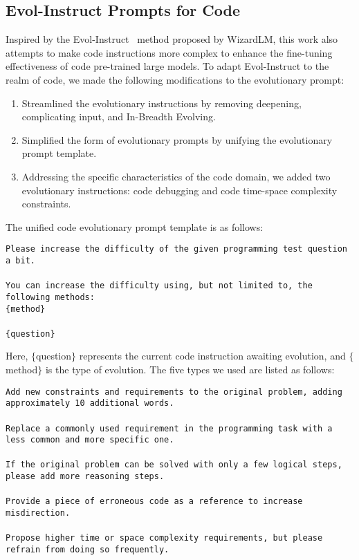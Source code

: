 \subsection{Evol-Instruct Prompts for Code}
Inspired by the Evol-Instruct~\cite{xu2023wizardlm} method proposed by WizardLM, this work also attempts to make code instructions more complex to enhance the fine-tuning effectiveness of code pre-trained large models. To adapt Evol-Instruct to the realm of code, we made the following modifications to the evolutionary prompt:
\begin{enumerate}
\item Streamlined the evolutionary instructions by removing deepening, complicating input, and In-Breadth Evolving.
\item Simplified the form of evolutionary prompts by unifying the evolutionary prompt template.
\item Addressing the specific characteristics of the code domain, we added two evolutionary instructions: code debugging and code time-space complexity constraints.
\end{enumerate}
The unified code evolutionary prompt template is as follows:
\begin{boxEnv}
\texttt{Please increase the difficulty of the given programming test question a bit. \\\\You can increase the difficulty using, but not limited to, the following methods:\\ \{method\}\\\\ \{question\}}
\end{boxEnv}
Here, $\{$question$\}$ represents the current code instruction awaiting evolution, and $\{$method$\}$ is the type of evolution. The five types we used are listed as follows:
\begin{boxEnv}
\texttt{Add new constraints and requirements to the original problem, adding approximately 10 additional words.\\\\Replace a commonly used requirement in the programming task with a less common and more specific one.\\\\If the original problem can be solved with only a few logical steps, please add more reasoning steps.\\\\Provide a piece of erroneous code as a reference to increase misdirection.\\\\Propose higher time or space complexity requirements, but please refrain from doing so frequently.}
\end{boxEnv}

